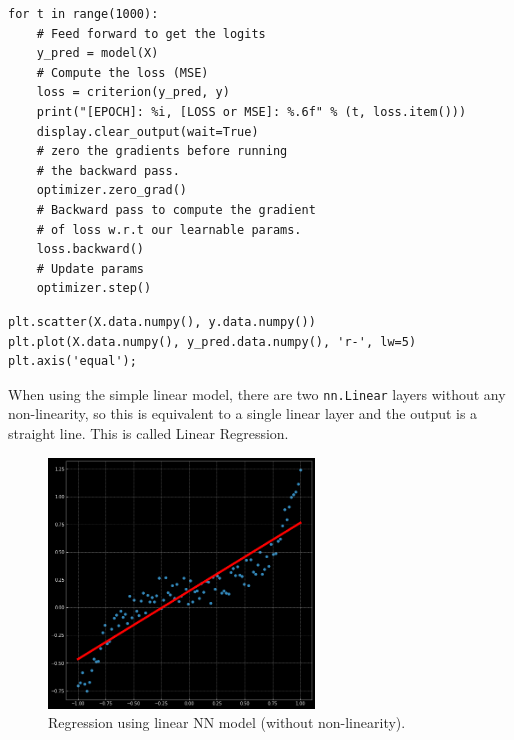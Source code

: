         \begin{verbatim}
for t in range(1000):    
    # Feed forward to get the logits
    y_pred = model(X)    
    # Compute the loss (MSE)
    loss = criterion(y_pred, y)
    print("[EPOCH]: %i, [LOSS or MSE]: %.6f" % (t, loss.item()))
    display.clear_output(wait=True)    
    # zero the gradients before running
    # the backward pass.
    optimizer.zero_grad()
    # Backward pass to compute the gradient
    # of loss w.r.t our learnable params. 
    loss.backward()    
    # Update params
    optimizer.step()
        \end{verbatim}
        \begin{verbatim}
plt.scatter(X.data.numpy(), y.data.numpy())
plt.plot(X.data.numpy(), y_pred.data.numpy(), 'r-', lw=5)
plt.axis('equal');        
        \end{verbatim}
        When using the simple linear model, there are two \texttt{nn.Linear} layers without any non-linearity, so this is equivalent to a single linear layer and the output is a straight line. This is called Linear Regression.
    
        \begin{figure}[H]
        \begin{center}
        \includegraphics[width=200pt]{figs/05-first_reg.png}
        \end{center} 
        \caption{Regression using linear NN model (without non-linearity).}
        \end{figure}
        

